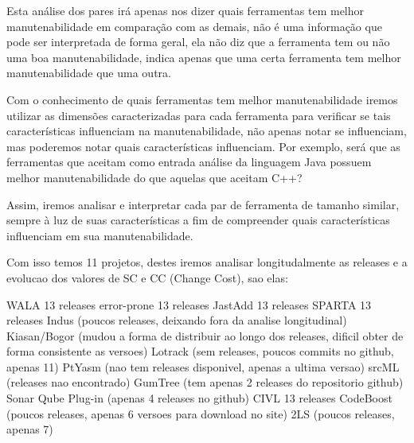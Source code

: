 Esta análise dos pares irá apenas nos dizer quais ferramentas tem melhor
manutenabilidade em comparação com as demais, não é uma informação que
pode ser interpretada de forma geral, ela não diz que a ferramenta tem
ou não uma boa manutenabilidade, indica apenas que uma certa ferramenta
tem melhor manutenabilidade que uma outra.

Com o conhecimento de quais ferramentas tem melhor manutenabilidade iremos
utilizar as dimensões caracterizadas para cada ferramenta para verificar se
tais características influenciam na manutenabilidade, não apenas notar se
influenciam, mas poderemos notar quais características influenciam. Por
exemplo, será que as ferramentas que aceitam como entrada análise da linguagem
Java possuem melhor manutenabilidade do que aquelas que aceitam C++?

Assim, iremos analisar e interpretar cada par de ferramenta de tamanho
similar, sempre à luz de suas características a fim de compreender quais
características influenciam em sua manutenabilidade.

Com isso temos 11 projetos, destes iremos analisar longitudalmente
as releases e a evolucao dos valores de SC e CC (Change Cost), sao elas:

WALA                     13 releases
error-prone              13 releases
JastAdd                  13 releases
SPARTA                   13 releases
Indus                    (poucos releases, deixando fora da analise longitudinal)
Kiasan/Bogor             (mudou a forma de distribuir ao longo dos releases, dificil obter de forma consistente as versoes)
Lotrack                  (sem releases, poucos commits no github, apenas 11)
PtYasm                   (nao tem releases disponivel, apenas a ultima versao)
srcML                    (releases nao encontrado)
GumTree                  (tem apenas 2 releases do repositorio github)
Sonar Qube Plug-in       (apenas 4 releases no github)
CIVL                     13 releases
CodeBoost                (poucos releases, apenas 6 versoes para download no site)
2LS                      (poucos releases, apenas 7)

